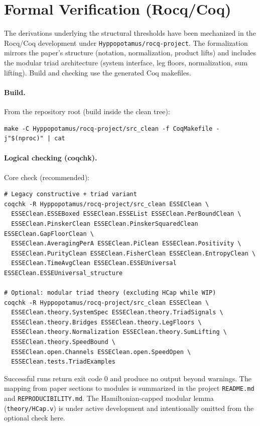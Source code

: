 \documentclass[10pt]{article}
\begin{document}
\section{Formal Verification (Rocq/Coq)}

The derivations underlying the structural thresholds have been mechanized in the Rocq/Coq development under \texttt{Hyppopotamus/rocq-project}. The formalization mirrors the paper’s structure (notation, normalization, product lifts) and includes the modular triad architecture (system interface, leg floors, normalization, sum lifting). Build and checking use the generated Coq makefiles.

\paragraph{Build.}
From the repository root (build inside the clean tree):
\begin{verbatim}
make -C Hyppopotamus/rocq-project/src_clean -f CoqMakefile -j"$(nproc)" | cat
\end{verbatim}

\paragraph{Logical checking (coqchk).}
Core check (recommended):
\begin{verbatim}
# Legacy constructive + triad variant
coqchk -R Hyppopotamus/rocq-project/src_clean ESSEClean \
  ESSEClean.ESSEBoxed ESSEClean.ESSEList ESSEClean.PerBoundClean \
  ESSEClean.PinskerClean ESSEClean.PinskerSquaredClean ESSEClean.GapFloorClean \
  ESSEClean.AveragingPerA ESSEClean.PiClean ESSEClean.Positivity \
  ESSEClean.PurityClean ESSEClean.FisherClean ESSEClean.EntropyClean \
  ESSEClean.TimeAvgClean ESSEClean.ESSEUniversal ESSEClean.ESSEUniversal_structure

# Optional: modular triad theory (excluding HCap while WIP)
coqchk -R Hyppopotamus/rocq-project/src_clean ESSEClean \
  ESSEClean.theory.SystemSpec ESSEClean.theory.TriadSignals \
  ESSEClean.theory.Bridges ESSEClean.theory.LegFloors \
  ESSEClean.theory.Normalization ESSEClean.theory.SumLifting \
  ESSEClean.theory.SpeedBound \
  ESSEClean.open.Channels ESSEClean.open.SpeedOpen \
  ESSEClean.tests.TriadExamples
\end{verbatim}
Successful runs return exit code 0 and produce no output beyond warnings. The mapping from paper sections to modules is summarized in the project \texttt{README.md} and \texttt{REPRODUCIBILITY.md}. The Hamiltonian-capped modular lemma (\texttt{theory/HCap.v}) is under active development and intentionally omitted from the optional check here.
\end{document}
